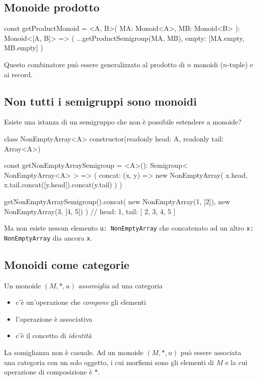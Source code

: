 \documentclass[12pt]{article}
\theoremstyle{definition}
\newenvironment{code}
  {\vspace{0.5cm} \VerbatimEnvironment\begin{typescriptcode}}
  {\end{typescriptcode} \vspace{0.2cm}}
\begin{document}
\subsection{Monoide prodotto}

\begin{code}
const getProductMonoid = <A, B>(
  MA: Monoid<A>,
  MB: Monoid<B>
): Monoid<[A, B]> => ({
  ...getProductSemigroup(MA, MB),
  empty: [MA.empty, MB.empty]
})
\end{code}

Questo combinatore può essere generalizzato al prodotto di $n$ monoidi ($n$-tuple) e ai record.

\subsection{Non tutti i semigruppi sono monoidi}

Esiste una istanza di un semigruppo che non è possibile estendere a monoide?

\begin{code}
class NonEmptyArray<A> {
  constructor(readonly head: A, readonly tail: Array<A>) {}
}

const getNonEmptyArraySemigroup = <A>(): Semigroup<
  NonEmptyArray<A>
> => ({
  concat: (x, y) =>
    new NonEmptyArray(
      x.head,
      x.tail.concat([y.head]).concat(y.tail)
    )
})

getNonEmptyArraySemigroup().concat(
  new NonEmptyArray(1, [2]),
  new NonEmptyArray(3, [4, 5])
) // { head: 1, tail: [ 2, 3, 4, 5 ] }
\end{code}

Ma non esiste nessun elemento \texttt{u: NonEmptyArray} che concatenato ad un altro \texttt{x: NonEmptyArray} dia ancora \texttt{x}.

\subsection{Monoidi come categorie}

Un monoide $(M, *, u)$ \emph{assomiglia} ad una categoria

\begin{itemize}
  \item c'è un'operazione che \emph{compone} gli elementi
  \item l'operazione è associativa
  \item c'è il concetto di \emph{identità}
\end{itemize}

La somiglianza non è casuale. Ad un monoide $(M, *, u)$ può essere associata una categoria con un solo oggetto,
i cui morfismi sono gli elementi di $M$ e la cui operazione di composizione è $*$.
\end{document}
